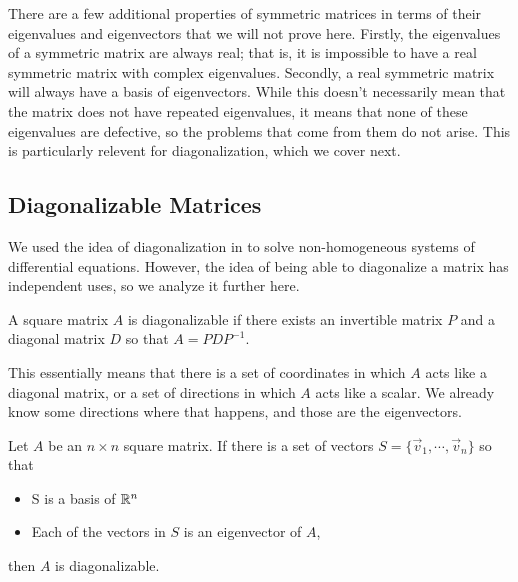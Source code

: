 \documentclass{ximera}
\begin{document}
There are a few additional properties of symmetric matrices in terms of their eigenvalues and eigenvectors that we will not prove here. Firstly, the eigenvalues of a symmetric matrix are always real; that is, it is impossible to have a real symmetric matrix with complex eigenvalues. Secondly, a real symmetric matrix will always have a basis of eigenvectors. While this doesn't necessarily mean that the matrix does not have repeated eigenvalues, it means that none of these eigenvalues are defective, so the problems that come from them do not arise. This is particularly relevent for diagonalization, which we cover next.

\subsection{Diagonalizable Matrices}

We used the idea of diagonalization in  to solve non-homogeneous systems of differential equations. However, the idea of being able to diagonalize a matrix has independent uses, so we analyze it further here. 

\begin{definition}
    A square matrix $A$ is diagonalizable if there exists an invertible matrix $P$ and a diagonal matrix $D$ so that $A = PDP^{-1}$. 
\end{definition}

This essentially means that there is a set of coordinates in which $A$ acts like a diagonal matrix, or a set of directions in which $A$ acts like a scalar. We already know some directions where that happens, and those are the eigenvectors. 

\begin{theorem}{}
    Let $A$ be an $n \times n$ square matrix. If there is a set of vectors $S = \{\vec{v}_1, \cdots, \vec{v}_n\}$ so that
    \begin{itemize}
        \item S is a basis of $\mathbb{R}^n$
        \item Each of the vectors in $S$ is an eigenvector of $A$,
    \end{itemize}
    then $A$ is diagonalizable. 
\end{theorem} 
\end{document}
